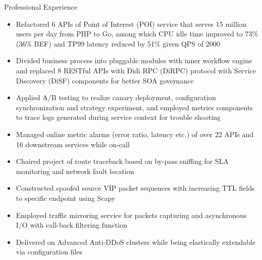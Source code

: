 \documentclass{resume} %
\begin{document}
\begin{workSection}{Professional Experience}
     \newpage
     \experienceItem[
        company=Didi Global,
        location=Beijing{,} China,
        position=Software Development Engineer,
        duration=Jan. 2021 -- Dec. 2021
    ]
     \vspace{-0.5em}
    \begin{itemize}
        \itemsep -6pt {} 
        \item Refactored 6 APIs of Point of Interest (POI) service that serves 15 million users per day from PHP to Go, among which CPU idle time improved to 73\%(36\% BEF) and TP99 latency reduced by 51\% given QPS of 2000 
        \item Divided business process into pluggable modules with inner workflow engine and replaced 8 RESTful APIs with Didi RPC (DiRPC) protocol with Service Discovery (DiSF) components for better SOA governance 
        \item Applied A/B testing to realize canary deployment, configuration synchronization and strategy experiment, and employed metrics components to trace logs generated during service context for trouble shooting 
        \item Managed online metric alarms (error ratio, latency etc.) of over 22 APIs and 16 downstream services while on-call 

     \end{itemize}

     \experienceItem[
        company=Alibaba Cloud,
        location=Hangzhou{,} China,
        position=Software Engineer Intern,
        duration=Jul. 2020 -- Sept. 2020
    ]
     \vspace{-0.5em}
    \begin{itemize}
        \itemsep -6pt {} 
        \item Chaired project of route traceback based on by-pass sniffing for SLA monitoring and network fault location 
        \item Constructed spoofed source VIP packet sequences with increasing TTL fields to specific endpoint using Scapy 
        \item Employed traffic mirroring service for packets capturing and asynchronous I/O with call-back filtering function     
        \item Delivered on Advanced Anti-DDoS clusters while being elastically extendable via configuration files 
     \end{itemize}
     
\end{workSection}
\end{document}
